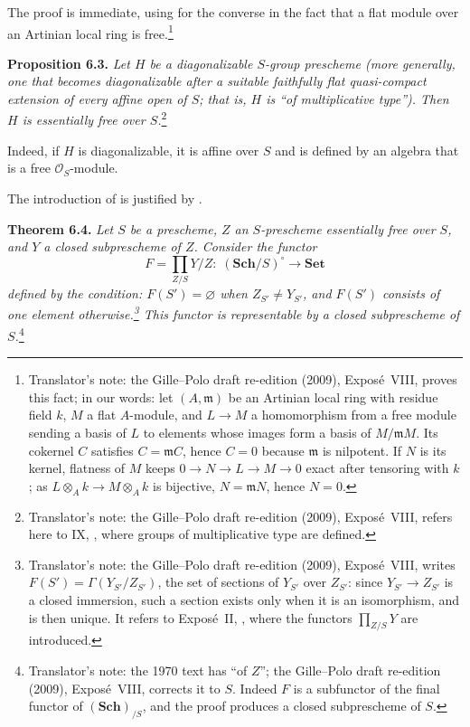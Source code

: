 The proof is immediate, using for the converse in  the fact that a
flat module over an Artinian local ring is free.\footnote{Translator's note: the Gille--Polo
draft re-edition (2009), Expos\'e~VIII, proves this fact; in our words: let \((A,\mathfrak m)\) be an
Artinian local ring with residue field \(k\), \(M\) a flat \(A\)-module, and \(L\to M\) a
homomorphism from a free module sending a basis of \(L\) to elements whose images form a basis of
\(M/\mathfrak mM\). Its cokernel \(C\) satisfies \(C=\mathfrak mC\), hence \(C=0\) because
\(\mathfrak m\) is nilpotent. If \(N\) is its kernel, flatness of \(M\) keeps
\(0\to N\to L\to M\to0\) exact after tensoring with \(k\); as \(L\otimes_Ak\to M\otimes_Ak\) is
bijective, \(N=\mathfrak mN\), hence \(N=0\).}

\medskip
\noindent{}\textbf{Proposition 6.3.}
\textit{Let \(H\) be a diagonalizable \(S\)-group prescheme
(more generally, one that becomes diagonalizable after a suitable
faithfully flat quasi-compact extension of every affine open of \(S\);
that is, \(H\) is ``of multiplicative type''). Then \(H\)
is essentially free over \(S\).}\footnote{Translator's note: the Gille--Polo draft re-edition (2009),
Expos\'e~VIII, refers here to IX, , where groups of
multiplicative type are defined.}

Indeed, if \(H\) is diagonalizable, it is affine over \(S\) and is
defined by an algebra that is a free \(\mathcal O_S\)-module.

The introduction of 
is justified by .

\medskip
\noindent{}\textbf{Theorem 6.4.}
\textit{Let \(S\) be a prescheme, \(Z\) an \(S\)-prescheme essentially
free over \(S\), and \(Y\) a closed subprescheme of \(Z\). Consider the
functor}
\[
  F=\prod_{Z/S}Y/Z:\;(\mathbf{Sch}/S)^\circ\longrightarrow\mathbf{Set}
\]
\textit{defined by the condition: \(F(S')=\varnothing\) when
\(Z_{S'}\ne Y_{S'}\), and \(F(S')\) consists of one element otherwise.\footnote{Translator's
note: the Gille--Polo draft re-edition (2009), Expos\'e~VIII, writes
\(F(S')=\Gamma(Y_{S'}/Z_{S'})\), the set of sections of \(Y_{S'}\) over \(Z_{S'}\): since
\(Y_{S'}\to Z_{S'}\) is a closed immersion, such a section exists only when it is an isomorphism,
and is then unique. It refers to Expos\'e~II, , where the functors
\(\prod_{Z/S}Y\) are introduced.}
This functor is representable by a closed subprescheme of \(S\).}\footnote{Translator's note:
the 1970 text has ``of \(Z\)''; the Gille--Polo draft re-edition (2009), Expos\'e~VIII, corrects it to
\(S\). Indeed \(F\) is a subfunctor of the final functor of \((\mathbf{Sch})_{/S}\), and the proof
produces a closed subprescheme of \(S\).}


